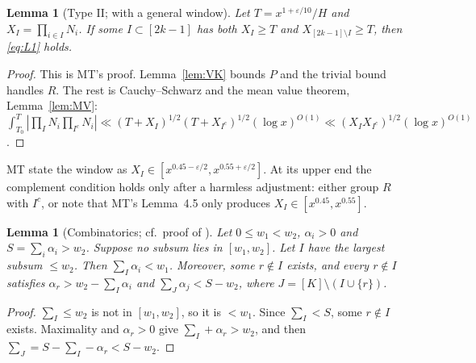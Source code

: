 \documentclass[11pt]{amsart}
\newtheorem{lemma}[theorem]{Lemma}
\theoremstyle{definition}
\theoremstyle{remark}
\newcommand{\e}{\varepsilon}
\begin{document}
\begin{lemma}[Type II; {\cite[Lemma~4.3]{MT}} with a general window]\label{lem:typeII}
Let $T=x^{1+\e/10}/H$ and $X_I=\prod_{i\in I}N_i$. If some $I\subset[2k-1]$ has both $X_I\ge T$ and $X_{[2k-1]\setminus I}\ge T$, then
\eqref{eq:L1} holds.
\end{lemma}

\begin{proof}
This is MT's proof. Lemma~\ref{lem:VK} bounds $P$ and the trivial bound handles $R$. The rest is
Cauchy--Schwarz and the mean value theorem, Lemma~\ref{lem:MV}:
$\int_{T_0}^T|\prod_I N_i\prod_{I^c}N_i|\ll(T+X_I)^{1/2}(T+X_{I^c})^{1/2}(\log x)^{O(1)}\ll(X_IX_{I^c})^{1/2}(\log x)^{O(1)}$.
\end{proof}

MT state the window as $X_I\in[x^{0.45-\e/2},x^{0.55+\e/2}]$. At its upper end the complement condition holds only after a
harmless adjustment: either group $R$ with $I^c$, or note that MT's Lemma~4.5 only produces $X_I\in[x^{0.45},x^{0.55}]$.

\begin{lemma}[Combinatorics; cf.\ proof of {\cite[Lemma~4.5]{MT}}]\label{lem:comb}
Let $0\le w_1<w_2$, $\alpha_i>0$ and $S=\sum_i\alpha_i>w_2$. Suppose no subsum lies in $[w_1,w_2]$. Let $I$ have the largest subsum
$\le w_2$. Then $\sum_I\alpha_i<w_1$. Moreover, some $r\notin I$ exists, and every $r\notin I$ satisfies $\alpha_r>w_2-\sum_I\alpha_i$ and
$\sum_{J}\alpha_j<S-w_2$, where $J=[K]\setminus(I\cup\{r\})$.
\end{lemma}

\begin{proof}
$\sum_I\le w_2$ is not in $[w_1,w_2]$, so it is $<w_1$. Since $\sum_I<S$, some $r\notin I$ exists. Maximality and
$\alpha_r>0$ give $\sum_I+\alpha_r>w_2$, and then $\sum_J=S-\sum_I-\alpha_r<S-w_2$.
\end{proof}
\end{document}
